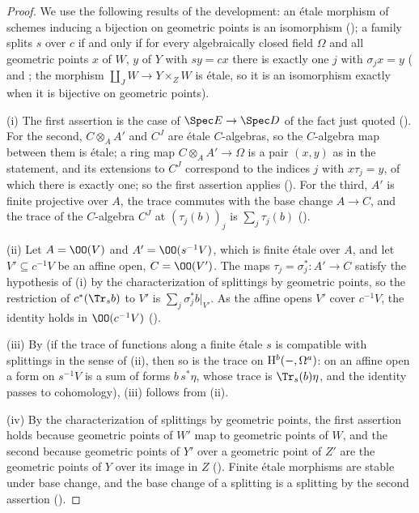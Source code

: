 \begin{proof}
We use the following results of the development: an \'etale morphism of schemes inducing a bijection on geometric points is
an isomorphism (); a family splits $s$ over $c$ if and only if for every algebraically
closed field $\Omega$ and all geometric points $x$ of $W$, $y$ of $Y$ with $sy=cx$ there is exactly one $j$ with
$\sigma_jx=y$ ( and ; the morphism
$\coprod_JW\to Y\times_ZW$ is \'etale, so it is an isomorphism exactly when it is bijective on geometric points).

(i) The first assertion is the case of $\Spec E\to\Spec D$ of the fact just quoted
(). For the second, $C\otimes_AA'$ and $C^J$ are \'etale $C$-algebras, so the
$C$-algebra map between them is \'etale; a ring map $C\otimes_AA'\to\Omega$ is a pair $(x,y)$ as in the statement, and its
extensions to $C^J$ correspond to the indices $j$ with $x\tau_j=y$, of which there is exactly one; so the first assertion
applies (). For the third, $A'$ is finite projective over $A$, the trace commutes
with the base change $A\to C$, and the trace of the $C$-algebra $C^J$ at $(\tau_j(b))_j$ is $\sum_j\tau_j(b)$
().

(ii) Let $A=\OO(V)$ and $A'=\OO(s^{-1}V)$, which is finite \'etale over $A$, and let $V'\subseteq c^{-1}V$ be an affine open,
$C=\OO(V')$. The maps $\tau_j=\sigma_j^*\colon A'\to C$ satisfy the hypothesis of (i) by the characterization of splittings
by geometric points, so the restriction of $c^*(\Tr_sb)$ to $V'$ is $\sum_j\sigma_j^*b|_{V'}$. As the affine opens $V'$ cover
$c^{-1}V$, the identity holds in $\OO(c^{-1}V)$ ().

(iii) By  (if the trace of functions along a finite \'etale $s$ is compatible with
splittings in the sense of (ii), then so is the trace on $\mathrm{H}^b(-,\Omega^a)$: on an affine open a form on $s^{-1}V$ is a
sum of forms $b\,s^*\eta$, whose trace is $\Tr_s(b)\eta$, and the identity passes to cohomology), (iii) follows from (ii).

(iv) By the characterization of splittings by geometric points, the first assertion holds because geometric points of $W'$
map to geometric points of $W$, and the second because geometric points of $Y'$ over a geometric point of $Z'$ are the
geometric points of $Y$ over its image in $Z$ (). Finite \'etale morphisms are
stable under base change, and the base change of a splitting is a splitting by the second assertion
().


\end{proof}
